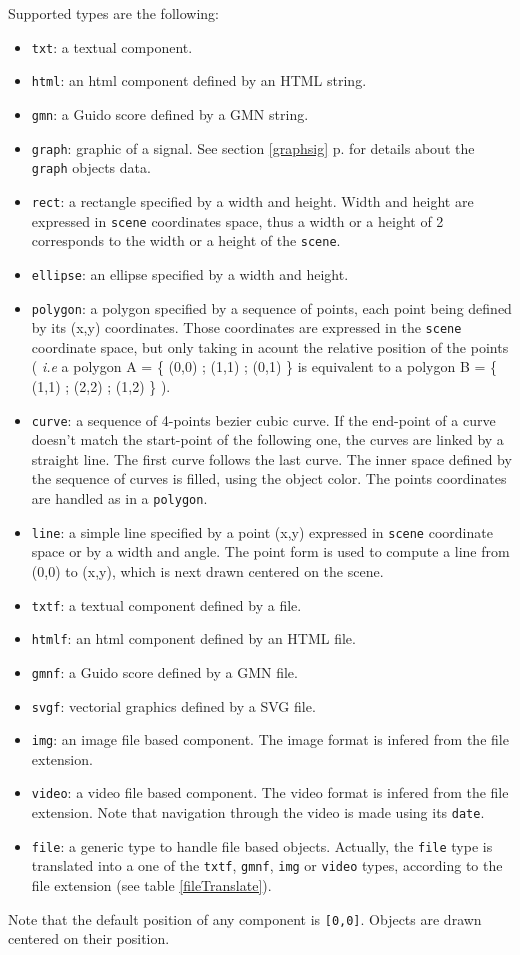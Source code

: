 \documentclass[a4paper,twoside]{report}
\newcommand{\fullref}[1]	{\ref{#1} p.\pageref{#1}}
\newcommand{\OSC}[1]		{\texttt{#1}}
\newcommand{\values}[1]	{\texttt{#1}}
\begin{document}
Supported types are the following:
\begin{itemize}
\item \OSC{txt}: a textual component.
\item \OSC{html}: an html component defined by an HTML string.
\item \OSC{gmn}: a Guido score defined by a GMN string.
\item \OSC{graph}: graphic of a signal. See section \fullref{graphsig} for details about the \OSC{graph} objects data.
\item \OSC{rect}: a rectangle specified by a width and height. Width and height are expressed in \OSC{scene} coordinates space, thus a width or a height of 2 corresponds to the width or a height of the \OSC{scene}.
\item \OSC{ellipse}: an ellipse specified by a width and height.
\item \OSC{polygon}: a polygon specified by a sequence of points, each point being defined by its (x,y) coordinates. Those coordinates are expressed in the \OSC{scene} coordinate space, but only taking in acount the relative position of the points ( \emph{i.e} a polygon A = \{ (0,0) ; (1,1) ; (0,1) \} is equivalent to a polygon B = \{ (1,1) ; (2,2) ; (1,2) \} ).
\item \OSC{curve}: a sequence of 4-points bezier cubic curve. If the end-point of a curve doesn't match the start-point of the following one, the curves are linked by a straight line. The first curve follows the last curve. The inner space defined by the sequence of curves is filled, using the object color. The points coordinates are handled as in a \OSC{polygon}.
\item \OSC{line}: a simple line specified by a point (x,y) expressed in \OSC{scene} coordinate space or by a width and angle. The point form is used to compute a line from (0,0) to (x,y), which is next drawn centered on the scene.
\item \OSC{txtf}: a textual component defined by a file.
\item \OSC{htmlf}: an html component defined by an HTML file.
\item \OSC{gmnf}: a Guido score defined by a GMN file.
\item \OSC{svgf}: vectorial graphics defined by a SVG file.
\item \OSC{img}: an image file based component. The image format is infered from the file extension.
\item \OSC{video}: a video file based component. The video format is infered from the file extension. Note that navigation through the video is made using its \OSC{date}.
\item \OSC{file}: a generic type to handle file based objects. Actually, the \OSC{file} type is translated into a one of the \OSC{txtf}, \OSC{gmnf}, \OSC{img} or \OSC{video} types, according to the file extension (see table \ref{fileTranslate}).
\end{itemize}
Note that the default position of any component is \values{[0,0]}. Objects are drawn centered on their position.
\end{document}

